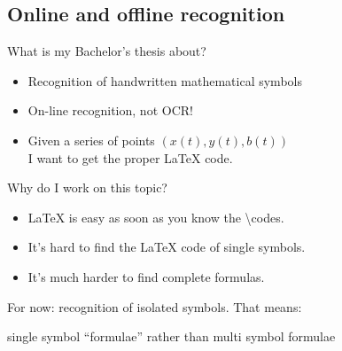 \subsection{Online and offline recognition}

\begin{frame}{What is my Bachelor's thesis about?}
    \begin{itemize}
        \item Recognition of handwritten mathematical symbols
        \item On-line recognition, not OCR!
        \item Given a series of points $(x(t), y(t), b(t))$\\
              I want to get the proper \LaTeX{} code.
    \end{itemize}
\end{frame}

\begin{frame}{Why do I work on this topic?}
    \begin{itemize}
        \item \LaTeX{} is easy as soon as you know the \textbackslash{}codes.
        \item It's hard to find the \LaTeX{} code of single symbols.
        \item It's much harder to find complete formulas.
    \end{itemize}


    For now: recognition of isolated symbols. That means:

    single symbol \enquote{formulae} rather than multi symbol formulae
\end{frame}